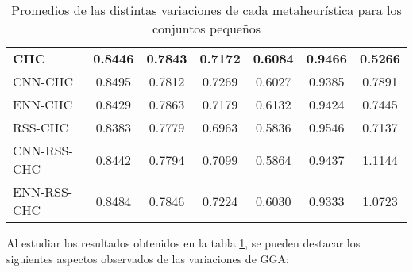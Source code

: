\begin{table}[h!]
\begin{tabular}{l c c c c c c}
\hline

\textbf{CHC} & \textbf{0.8446} & \textbf{0.7843} & \textbf{0.7172} & \textbf{0.6084} & \textbf{0.9466} & \textbf{0.5266} \\
CNN-CHC & 0.8495 & 0.7812 & 0.7269 & 0.6027 & 0.9385 & 0.7891 \\
ENN-CHC & 0.8429 & 0.7863 & 0.7179 & 0.6132 & 0.9424 & 0.7445 \\
RSS-CHC & 0.8383 & 0.7779 & 0.6963 & 0.5836 & 0.9546 & 0.7137 \\
CNN-RSS-CHC  & 0.8442 & 0.7794 & 0.7099 & 0.5864 & 0.9437 & 1.1144 \\
ENN-RSS-CHC & 0.8484 & 0.7846 & 0.7224 & 0.6030 & 0.9333 & 1.0723 \\

\hline
\end{tabular}
\caption{Promedios de las distintas variaciones de cada metaheurística para los conjuntos pequeños}
\label{peq-all}
\end{table}

Al estudiar los resultados obtenidos en la tabla \ref{peq-all}, se pueden destacar los siguientes aspectos observados de las variaciones de GGA:

